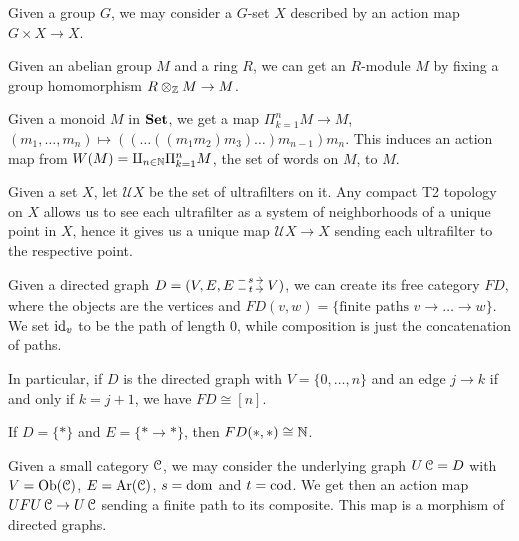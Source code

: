 \documentclass[a4paper,11pt,oneside,openany]{scrbook}
\begin{document}
	\begin{exmp}
		Given a group $G$, we may consider a $G$-set $X$ described by an action map $G\times X\rightarrow X$.
	\end{exmp}
	\begin{exmp}
		Given an abelian group $M$ and a ring $R$, we can get an $R$-module $M$ by fixing a group homomorphism $R\otimes_{\operatorname{\mathbb{Z}}} M\rightarrow M$.
	\end{exmp}
	\begin{exmp}
		Given a monoid $M$ in ${\normalfont\textbf{Set}}$, we get a map $\Pi_{k=1}^n M\rightarrow M$, $(m_1,\ldots,m_n)\mapsto ((\ldots ((m_1m_2)m_3)\ldots )m_{n-1}) m_n$. This induces an action map from $W(M)=\amalg_{n\in\operatorname{\mathbb{N}}}\Pi_{k=1}^n M$, the set of words on $M$, to $M$.
	\end{exmp}
	\begin{exmp}\label{ultrafilters}
		Given a set $X$, let $\mathcal{U}X$ be the set of ultrafilters on it. Any compact T2 topology on $X$ allows us to see each ultrafilter as a system of neighborhoods of a unique point in $X$, hence it gives us a unique map $\mathcal{U}X\rightarrow X$ sending each ultrafilter to the respective point.
	\end{exmp}
	\begin{exmp}
		Given a directed graph $D=(V,E,\hspace{-1.5mm}\begin{tikzcd}
		E\hspace{-1.5mm}\arrow[r, "t" description,  shift right=.5ex, shorten <= .3em, shorten >= .3em]  \arrow[r, "s" description, shift left=1ex, shorten <= .3em, shorten >= .3em] & \hspace{-1.5mm}V
		\end{tikzcd}\hspace{-1.5mm})$, we can create its free category $FD$, where the objects are the vertices and $FD(v,w)=\{\text{finite paths } v\rightarrow\ldots\rightarrow w\}$. We set $\operatorname{id}_v$ to be the path of length 0, while composition is just the concatenation of paths.
		
		In particular, if $D$ is the directed graph with $V=\{0,\ldots,n\}$ and an edge $j\rightarrow k$ if and only if $k=j+1$, we have $FD\cong [n]$.
		
		If $D=\{*\}$ and $E=\{*\rightarrow *\}$, then $FD(*,*)\cong\operatorname{\mathbb{N}}$.
		
		Given a small category $\operatorname{\mathcal{C}}$, we may consider the underlying graph $U\operatorname{\mathcal{C}}=D$ with $V=\operatorname{Ob}(\operatorname{\mathcal{C}})$, $E=\operatorname{Ar}(\operatorname{\mathcal{C}})$, $s=\operatorname{dom}$ and $t=\operatorname{cod}$. We get then an action map $UFU\operatorname{\mathcal{C}}\rightarrow U\operatorname{\mathcal{C}}$ sending a finite path to its composite. This map is a morphism of directed graphs.
	\end{exmp}
\end{document}
